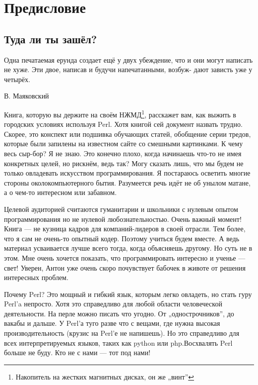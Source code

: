 \section{Предисловие}
\subsection{Туда ли ты зашёл?}
\begin{em}
Одна печатаемая ерунда создает ещё у двух убеждение, что и они могут
написать не хуже. Эти двое, написав и будучи напечатанными, возбуж-
дают зависть уже у четырёх.
\begin{flushright}
В. Маяковский
\end{flushright}
\end{em}
Книга, которую вы держите на своём НЖМД\footnote{Накопитель
на жестких магнитных дисках, он же „винт”}, расскажет вам, как выжить
в городских условиях используя Perl. Хотя книгой сей документ назвать
трудно. Скорее, это конспект или подшивка обучающих статей, обобщение серии
тредов, которые были запилены на известном сайте со смешными картинками.
К чему весь сыр-бор? Я не знаю. Это конечно плохо, когда начинаешь
что-то не имея конкретных целей, но рискнём, ведь так? Могу сказать
лишь, что мы будем не только овладевать искусством программирования. 
Я постараюсь осветить многие стороны околокомпьютерного бытия.
Разумеется речь идёт не об унылом матане, а о чем-то интересном или 
забавном.

Целевой аудиторией считаются гуманитарии и школьники с нулевым
опытом программирования но не нулевой любознательностью. Очень важный
момент! Книга — не кузница кадров для компаний-лидеров в своей
отрасли. Тем более, что я сам не очень-то опытный кодер. Поэтому
учиться будем вместе. А ведь материал усваивается лучше всего тогда,
когда объясняешь другому. Но суть не в этом. Мне очень хочется показать,
что программировать интересно и ученье — свет! Уверен, Антон уже очень
скоро почувствует бабочек в животе от решения интересных проблем.

Почему Perl? Это мощный и гибкий язык, которым легко овладеть, но
стать гуру Perl’a непросто. Хотя это справедливо для любой области
человеческой деятельности. На перле можно писать что угодно. От
„однострочников”, до вакабы и дальше. У Perl’а туго разве что с вещами,
где нужна высокая производительность (крузис на Perl’е не напишешь).
Но это справедливо для всех интерпретируемых языков, таких как python
или php.Восхвалять Perl больше не буду. Кто не с нами — тот под нами!

